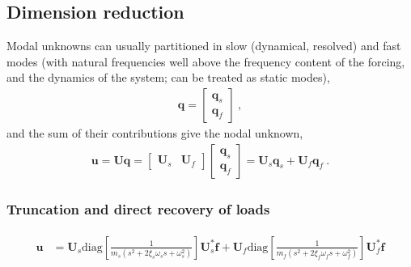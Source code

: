 \documentclass[letterpaper,10pt,english]{jupyterBook}
\begin{document}
\subsection{Dimension reduction}
\label{\detokenize{ch/solids/small-displacements-numerics:dimension-reduction}}
\sphinxAtStartPar
Modal unknowns can usually partitioned in slow (dynamical, resolved) and fast modes (with natural frequencies well above the frequency content of the forcing, and the dynamics of the system; can be treated as static modes),
\begin{equation*}
\begin{split}\mathbf{q} = \begin{bmatrix} \mathbf{q}_s \\ \mathbf{q}_f \end{bmatrix} \ ,\end{split}
\end{equation*}
\sphinxAtStartPar
and the sum of their contributions give the nodal unknown,
\begin{equation*}
\begin{split}\mathbf{u} = \mathbf{U} \mathbf{q} = \begin{bmatrix} \mathbf{U}_s & \mathbf{U}_f \end{bmatrix} \begin{bmatrix} \mathbf{q}_s \\ \mathbf{q}_f \end{bmatrix} = \mathbf{U}_s \mathbf{q}_s + \mathbf{U}_f \mathbf{q}_f \ .\end{split}
\end{equation*}

\subsubsection{Truncation and direct recovery of loads}
\label{\detokenize{ch/solids/small-displacements-numerics:truncation-and-direct-recovery-of-loads}}\begin{equation*}
\begin{split}\begin{aligned}
  \mathbf{u} 
  & = \mathbf{U}_s \text{diag}\left[ \frac{1}{m_s ( s^2 + 2 \xi_s \omega_s s + \omega^2_s )} \right] \mathbf{U}_s^* \mathbf{f} 
    + \mathbf{U}_f \text{diag}\left[ \frac{1}{m_f ( s^2 + 2 \xi_f \omega_f s + \omega^2_f )} \right] \mathbf{U}_f^* \mathbf{f}
\end{aligned}\end{split}
\end{equation*}
\end{document}
